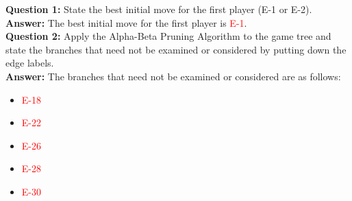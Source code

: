 \documentclass{book}
\begin{document}
\textbf{Question 1:} State the best initial move for the first player (E-1 or E-2).
\textbf{Answer:} The best initial move for the first player is \textcolor{red}{E-1}.\\
\vspace{3mm}
\textbf{Question 2:} Apply the Alpha-Beta Pruning Algorithm to the game tree and state the branches that need not be examined or considered by putting down the edge labels.\\
\textbf{Answer:} The branches that need not be examined or considered are as follows:
\begin{itemize}
    \item \textcolor{red}{E-18}
    \item \textcolor{red}{E-22}
    \item \textcolor{red}{E-26}
    \item \textcolor{red}{E-28}
    \item \textcolor{red}{E-30}
\end{itemize}
\end{document}

